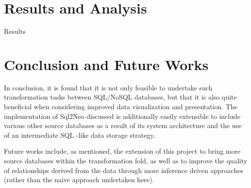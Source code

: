 \documentclass[12pt]{article}
\newcommand{\sectionfontstyle}{\fontsize{16pt}{1em}\usefont{T1}{phv}{b}{n}}
\begin{document}
    \newpage

    \section{\sectionfontstyle Results and Analysis}
    Results

    \newpage

    \section{\sectionfontstyle Conclusion and Future Works}
    In conclusion, it is found that it is not only feasible to undertake such transformation tasks between SQL/NoSQL databases, but that it is also quite beneficial when considering improved data visualization and presentation. The implementation of Sql2Neo discussed is additionally easily extensible to include various other source databases as a result of its system architecture and the use of an intermediate SQL -like data storage strategy. 

    Future works include, as mentioned, the extension of this project to bring more source databases within the transformation fold, as well as to improve the quality of relationships derived from the data through more inference driven approaches (rather than the naive approach undertaken here). 

    \newpage

    
    
\end{document}
